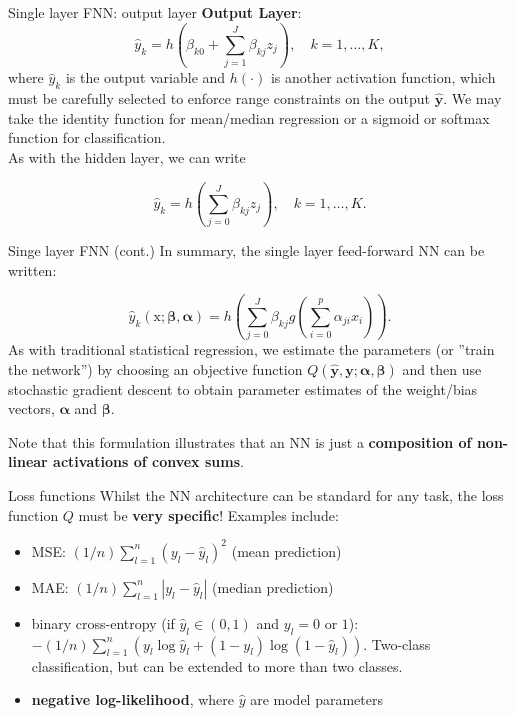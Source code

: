 \documentclass{beamer}
\begin{document}
\begin{frame}{Single layer FNN: output layer}
\textbf{Output Layer}:
$$
\hat{y}_{k}=h\left(\beta_{k 0}+\sum_{j=1}^{J} \beta_{k j} z_{j}\right), \quad k=1, \ldots, K,
$$
where $\hat{y}_{k}$ is the output variable and $h(\cdot)$ is another activation function, which must be carefully selected to enforce range constraints on the output $\hat{\mathbf{y}}$. We may take the identity function for mean/median regression or a sigmoid or softmax function for classification.\\

As with the hidden layer, we can write

$$
\hat{y}_{k}=h\left(\sum_{j=0}^{J} \beta_{k j} z_{j}\right), \quad k=1, \ldots, K.
$$
\end{frame}
\begin{frame}{Singe layer FNN (cont.)}
In summary, the single layer feed-forward NN can be written:

$$
\hat{y}_{k}(\mathrm{x} ; \boldsymbol{\beta}, \boldsymbol{\alpha})=h\left(\sum_{j=0}^{J} \beta_{k j} g\left(\sum_{i=0}^{p} \alpha_{j i} x_{i}\right)\right).
$$
As with traditional statistical regression, we estimate the parameters (or ''train the network'') by choosing an objective function $Q(\hat{\mathbf{y}},\mathbf{y}; \boldsymbol{\alpha}, \boldsymbol{\beta})$ and then use stochastic gradient descent to obtain parameter estimates of the weight/bias vectors, $\boldsymbol{\alpha}$ and $\boldsymbol{\beta}$.

Note that this formulation illustrates that an NN is just a \textbf{composition of non-linear activations of convex sums}.
\end{frame}
\begin{frame}{Loss functions}
 Whilst the NN architecture can be standard for any task, the loss function $Q$ must be \textbf{very specific}! Examples include:
\begin{itemize}
\item MSE: $(1/n)\sum^n_{l=1}(y_l-\hat{y}_l)^2$ (mean prediction)
\item MAE: $(1/n)\sum^n_{l=1}|y_l-\hat{y}_l|$ (median prediction)
\item binary cross-entropy (if $\hat{y}_l\in(0,1)$ and $y_l=0$ or $1$): $-(1/n)\sum^n_{l=1}(y_l\log\hat{y}_l+(1-y_l)\log(1-\hat{y}_l))$. Two-class classification, but can be extended to more than two classes.
\item \textbf{negative log-likelihood}, where $\hat{y}$ are model parameters
\end{itemize}
\end{frame}
\end{document}
